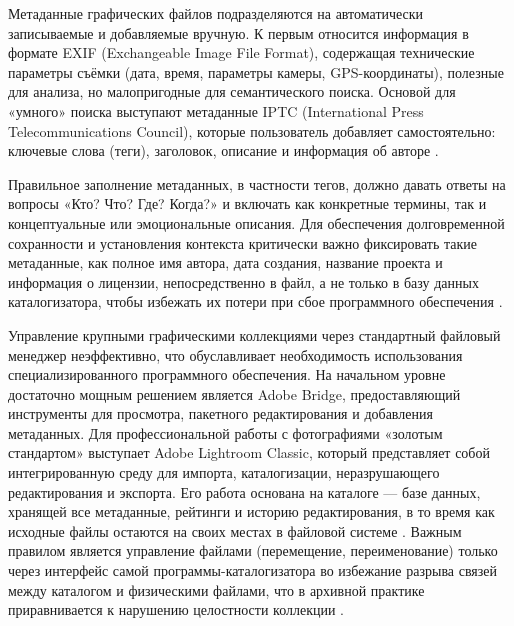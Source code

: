 \documentclass{SibFU-docs}
\begin{document}

Метаданные графических файлов подразделяются на автоматически записываемые и добавляемые вручную. К первым относится информация в формате EXIF (Exchangeable Image File Format), содержащая технические параметры съёмки (дата, время, параметры камеры, GPS-координаты), полезные для анализа, но малопригодные для семантического поиска. Основой для «умного» поиска выступают метаданные IPTC (International Press Telecommunications Council), которые пользователь добавляет самостоятельно: ключевые слова (теги), заголовок, описание и информация об авторе \cite{iipa_metadata_handbook}.

Правильное заполнение метаданных, в частности тегов, должно давать ответы на вопросы «Кто? Что? Где? Когда?» и включать как конкретные термины, так и концептуальные или эмоциональные описания. Для обеспечения долговременной сохранности и установления контекста критически важно фиксировать такие метаданные, как полное имя автора, дата создания, название проекта и информация о лицензии, непосредственно в файл, а не только в базу данных каталогизатора, чтобы избежать их потери при сбое программного обеспечения \cite{oais_reference_model, iipa_metadata_handbook}.


Управление крупными графическими коллекциями через стандартный файловый менеджер неэффективно, что обуславливает необходимость использования специализированного программного обеспечения. На начальном уровне достаточно мощным решением является Adobe Bridge, предоставляющий инструменты для просмотра, пакетного редактирования и добавления метаданных. Для профессиональной работы с фотографиями «золотым стандартом» выступает Adobe Lightroom Classic, который представляет собой интегрированную среду для импорта, каталогизации, неразрушающего редактирования и экспорта. Его работа основана на каталоге — базе данных, хранящей все метаданные, рейтинги и историю редактирования, в то время как исходные файлы остаются на своих местах в файловой системе \cite{iipa_metadata_handbook}. Важным правилом является управление файлами (перемещение, переименование) только через интерфейс самой программы-каталогизатора во избежание разрыва связей между каталогом и физическими файлами, что в архивной практике приравнивается к нарушению целостности коллекции \cite{oais_reference_model}.

\end{document}

